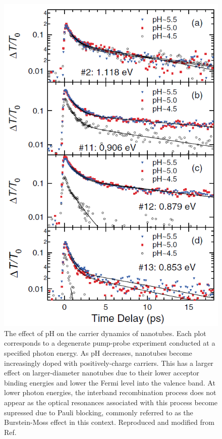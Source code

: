 \begin{figure}[H]
	\centering
	\includegraphics[scale=0.5]{images/chapter_prior_works/dtt_ph_gordana}
	\caption{The effect of pH on the carrier dynamics of nanotubes. Each plot corresponds to a degenerate pump-probe experiment conducted at a specified photon energy. As pH decreases, nanotubes become increasingly doped with positively-charge carriers. This has a larger effect on larger-diameter nanotubes due to their lower acceptor binding energies and lower the Fermi level into the valence band. At lower photon energies, the interband recombination process does not appear as the optical resonances associated with this process become supressed due to Pauli blocking, commonly referred to as the Burstein-Moss effect in this context. Reproduced and modified from Ref.\ \cite{ostojic2004interband}}
	\label{fig:dtt_ph_gordana}
\end{figure}

